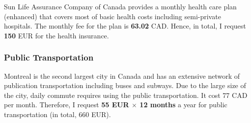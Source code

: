 \documentclass[11pt, oneside]{essay}
\begin{document}
Sun Life Assurance Company of Canada provides a monthly health
care plan (enhanced) that covers most of basic health costs including
semi-private hospitals. The monthly fee for the plan is
\textbf{63.02} CAD. Hence, in total, I request \textbf{150} EUR
for the health insurance.



\subsubsection{Public Transportation}

Montreal is the second largest city in Canada and has an
extensive network of publication transportation including buses
and subways. Due to the large size of the city, daily commute
requires using the public transportation. It cost 77 CAD per
month. Therefore, I request \textbf{55 EUR $\times$ 12 months} a
year for public transportation (in total, 660 EUR).








%
%
\end{document}
